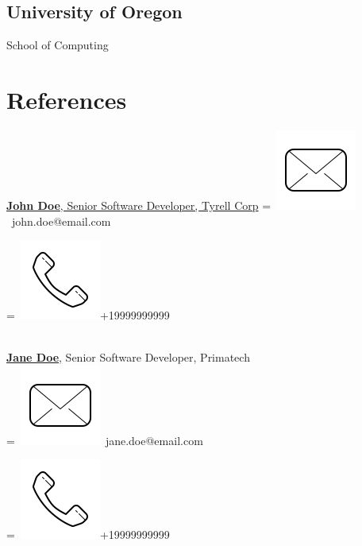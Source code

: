 \documentclass[]{PlushCV}
\begin{document}
\begin{minipage}[t]{0.25\textwidth}
\sectionsep
\subsection{University of Oregon}
School of Computing \\
\sectionsep


\section{References}
\href{https://www.linkedin.com/company/john-doe/}{\textbf{John Doe}, Senior Software Developer, Tyrell Corp}
\begingroup
{}=\hbox{
\includegraphics[scale=0.1,trim={0 1cm 0cm 0cm}]{icons/main/mail.png}\hspace{0.3cm} john.doe@email.com
}
\parbox{\wd0}{}
\endgroup
\begingroup
{}=\hbox{
\includegraphics[scale=0.1,trim={0 1.25cm -0.4cm 0cm}]{icons/main/phone.png}\hspace{0.3cm}+19999999999
}
\parbox{\wd0}{}\endgroup
\\
\sectionsep
\href{https://www.linkedin.com/company/john-doe/}{\textbf{Jane Doe}}, Senior Software Developer, Primatech
\\
\begingroup
{}=\hbox{
\includegraphics[scale=0.1,trim={0 1cm 0cm 0cm}]{icons/main/mail.png}\hspace{0.3cm} jane.doe@email.com
}
\parbox{\wd0}{}
\endgroup
\begingroup
{}=\hbox{
\includegraphics[scale=0.1,trim={0 1.25cm -0.4cm 0cm}]{icons/main/phone.png}\hspace{0.3cm}+19999999999
}
\parbox{\wd0}{}\endgroup
\\


\end{minipage}
\end{document}
